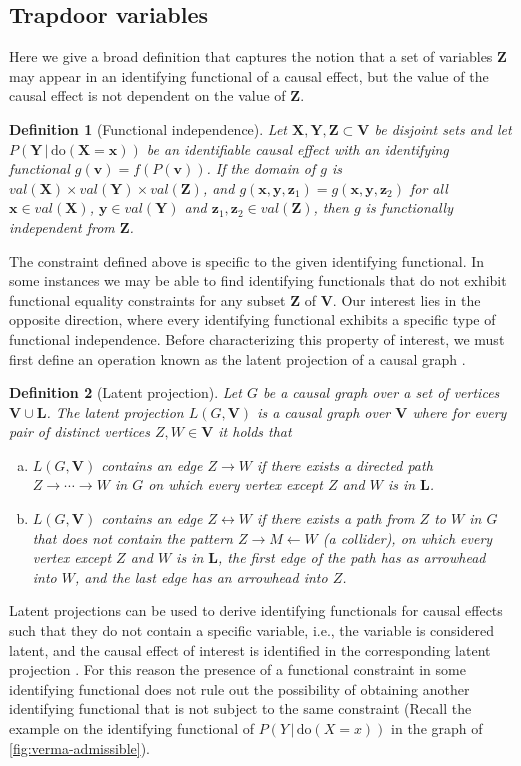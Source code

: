 \documentclass[11pt,a4paper,twoside]{article}
\newtheorem{definition}{Definition}
\newcommand{\+}[1]{\ensuremath{\mathbf{#1}}}
\newcommand{\doo}{\textrm{do}}
\newcommand{\given}{{ \, | \, }}
\begin{document}
\subsection{Trapdoor variables}\label{sec:trapdoor}

	Here we give a broad definition that captures the notion that a set of variables $\+ Z$ may appear in an identifying functional of a causal effect, but the value of the causal effect is not dependent on the value of $\+ Z$. 
	\begin{definition}[Functional independence]
		Let $\+ X, \+Y, \+ Z \subset \+ V$ be disjoint sets and let ${P(\+Y \given \doo(\+ X  = \+ x))}$ be an identifiable causal effect with an identifying functional $g(\+ v) = f(P(\+ v))$. If the domain of $g$ is $val(\+ X) \times val(\+ Y) \times val(\+ Z)$, and $g(\+ x, \+ y, \+ z_1) = g(\+ x, \+ y, \+ z_2)$ for all $\+ x \in val(\+ X)$, $\+y \in val(\+ Y)$ and $\+ z_1,\+ z_2 \in val(\+ Z)$, then $g$ is \emph{functionally independent} from $\+ Z$. 
	\end{definition}
	The constraint defined above is specific to the given identifying functional. In some instances we may be able to find identifying functionals that do not exhibit functional equality constraints for any subset $\+ Z$ of $\+ V$. Our interest lies in the opposite direction, where every identifying functional exhibits a specific type of functional independence. Before characterizing this property of interest, we must first define an operation known as the latent projection of a causal graph \citep{pearl1991}.
	\begin{definition}[Latent projection] Let $G$ be a causal graph over a set of vertices $\+ V \cup \+ L$. The \emph{latent projection} $L(G, \+ V)$ is a causal graph over $\+ V$ where for every pair of distinct vertices $Z,W \in \+ V$ it holds that
		\begin{enumerate}[(a),leftmargin=*]
			\item $L(G, \+ V)$ contains an edge $Z \longrightarrow W$ if there exists a directed path $Z \longrightarrow \cdots \longrightarrow W$ in $G$ on which every vertex except $Z$ and $W$ is in $\+ L$.
			\item $L(G, \+ V)$ contains an edge $Z \longleftrightarrow W$ if there exists a path from $Z$ to $W$ in $G$ that does not contain the pattern $Z \longrightarrow M \longleftarrow W$ (a collider), on which every vertex except $Z$ and $W$ is in $\+ L$, the first edge of the path has as arrowhead into $W$, and the last edge has an arrowhead into $Z$.
		\end{enumerate}
	\end{definition}
	Latent projections can be used to derive identifying functionals for causal effects such that they do not contain a specific variable, i.e., the variable is considered latent, and the causal effect of interest is identified in the corresponding latent projection \citep{tikka18}. For this reason the presence of a functional constraint in some identifying functional does not rule out the possibility of obtaining another identifying functional that is not subject to the same constraint (Recall the example on the identifying functional of $P(Y \given \doo(X = x))$ in the graph of \autoref{fig:verma-admissible}).
\end{document}
